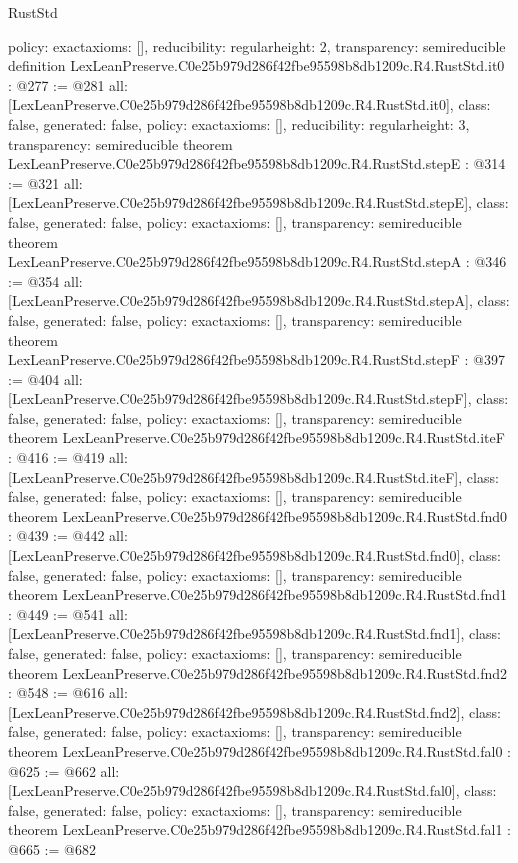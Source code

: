 \begin{lexlean}{RustStd}
\begin{coremodule}
{  policy: exact{axioms: []},
  reducibility: regular{height: 2},
  transparency: semireducible
}
definition LexLeanPreserve.C0e25b979d286f42fbe95598b8db1209c.R4.RustStd.it0 : @277 := @281 {
  all: [LexLeanPreserve.C0e25b979d286f42fbe95598b8db1209c.R4.RustStd.it0],
  class: false,
  generated: false,
  policy: exact{axioms: []},
  reducibility: regular{height: 3},
  transparency: semireducible
}
theorem LexLeanPreserve.C0e25b979d286f42fbe95598b8db1209c.R4.RustStd.stepE : @314 := @321 {
  all: [LexLeanPreserve.C0e25b979d286f42fbe95598b8db1209c.R4.RustStd.stepE],
  class: false,
  generated: false,
  policy: exact{axioms: []},
  transparency: semireducible
}
theorem LexLeanPreserve.C0e25b979d286f42fbe95598b8db1209c.R4.RustStd.stepA : @346 := @354 {
  all: [LexLeanPreserve.C0e25b979d286f42fbe95598b8db1209c.R4.RustStd.stepA],
  class: false,
  generated: false,
  policy: exact{axioms: []},
  transparency: semireducible
}
theorem LexLeanPreserve.C0e25b979d286f42fbe95598b8db1209c.R4.RustStd.stepF : @397 := @404 {
  all: [LexLeanPreserve.C0e25b979d286f42fbe95598b8db1209c.R4.RustStd.stepF],
  class: false,
  generated: false,
  policy: exact{axioms: []},
  transparency: semireducible
}
theorem LexLeanPreserve.C0e25b979d286f42fbe95598b8db1209c.R4.RustStd.iteF : @416 := @419 {
  all: [LexLeanPreserve.C0e25b979d286f42fbe95598b8db1209c.R4.RustStd.iteF],
  class: false,
  generated: false,
  policy: exact{axioms: []},
  transparency: semireducible
}
theorem LexLeanPreserve.C0e25b979d286f42fbe95598b8db1209c.R4.RustStd.fnd0 : @439 := @442 {
  all: [LexLeanPreserve.C0e25b979d286f42fbe95598b8db1209c.R4.RustStd.fnd0],
  class: false,
  generated: false,
  policy: exact{axioms: []},
  transparency: semireducible
}
theorem LexLeanPreserve.C0e25b979d286f42fbe95598b8db1209c.R4.RustStd.fnd1 : @449 := @541 {
  all: [LexLeanPreserve.C0e25b979d286f42fbe95598b8db1209c.R4.RustStd.fnd1],
  class: false,
  generated: false,
  policy: exact{axioms: []},
  transparency: semireducible
}
theorem LexLeanPreserve.C0e25b979d286f42fbe95598b8db1209c.R4.RustStd.fnd2 : @548 := @616 {
  all: [LexLeanPreserve.C0e25b979d286f42fbe95598b8db1209c.R4.RustStd.fnd2],
  class: false,
  generated: false,
  policy: exact{axioms: []},
  transparency: semireducible
}
theorem LexLeanPreserve.C0e25b979d286f42fbe95598b8db1209c.R4.RustStd.fal0 : @625 := @662 {
  all: [LexLeanPreserve.C0e25b979d286f42fbe95598b8db1209c.R4.RustStd.fal0],
  class: false,
  generated: false,
  policy: exact{axioms: []},
  transparency: semireducible
}
theorem LexLeanPreserve.C0e25b979d286f42fbe95598b8db1209c.R4.RustStd.fal1 : @665 := @682 {
}
\end{coremodule}
\end{lexlean}
